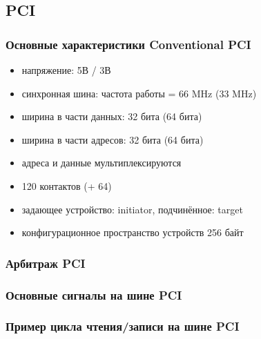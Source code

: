 \subsection{PCI}
\begin{frame}
\frametitle{Основные характеристики Conventional PCI}
\begin{itemize}
    \item напряжение: 5В / 3В
    \item синхронная шина: частота работы = 66 MHz (33 MHz)
    \item ширина в части данных: 32 бита (64 бита)
    \item ширина в части адресов: 32 бита (64 бита)
    \item адреса и данные мультиплексируются
    \item 120 контактов (+ 64)
    \item задающее устройство: initiator, подчинённое: target
    \item конфигурационное пространство устройств 256 байт
\end{itemize}
\end{frame}

\begin{frame}
\frametitle{Арбитраж PCI}
\end{frame}

\begin{frame}
\frametitle{Основные сигналы на шине PCI}
\end{frame}

\begin{frame}
\frametitle{Пример цикла чтения/записи на шине PCI}
\end{frame}
